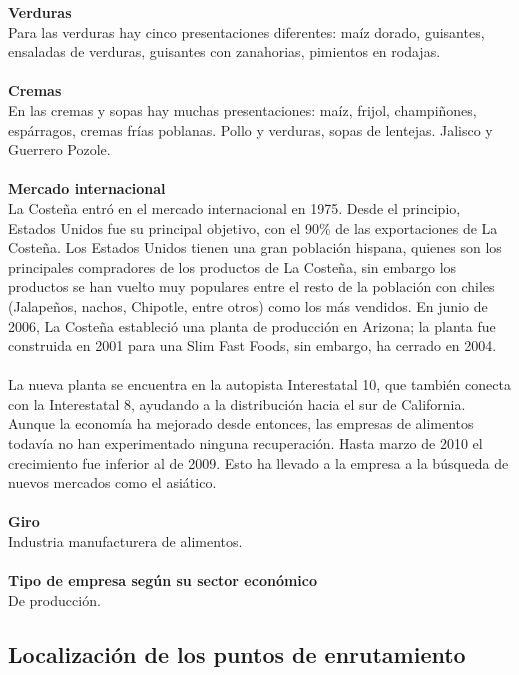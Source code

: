 \documentclass[12pt,letterpaper]{article}
\begin{document}
\textbf{Verduras} 
\\
Para las verduras hay cinco presentaciones diferentes: maíz dorado, guisantes, ensaladas de verduras, guisantes con zanahorias, pimientos en rodajas.
\\ \\
\textbf{Cremas} 
\\
En las cremas y sopas hay muchas presentaciones: maíz, frijol, champiñones, espárragos, cremas frías poblanas. Pollo y verduras, sopas de lentejas. Jalisco y Guerrero Pozole.
\\ \\
\textbf{Mercado internacional}
\\
La Costeña entró en el mercado internacional en 1975. Desde el principio, Estados Unidos fue su 
principal objetivo, con el 90\% de las exportaciones de La Costeña. Los Estados Unidos 
tienen una gran población hispana, quienes son los principales compradores de los productos 
de La Costeña, sin embargo los productos se han vuelto muy populares entre el resto de la 
población con chiles (Jalapeños, nachos, Chipotle, entre otros) como los más vendidos. En 
junio de 2006, La Costeña estableció una planta de producción en Arizona; la planta fue 
construida en 2001 para una Slim Fast Foods, sin embargo, ha cerrado en 2004. 
\\ \\
La nueva 
planta se encuentra en la autopista Interestatal 10, que también conecta con la 
Interestatal 8, ayudando a la distribución hacia el sur de California. Aunque la 
economía ha mejorado desde entonces, las empresas de alimentos todavía no han experimentado 
ninguna recuperación. Hasta marzo de 2010 el crecimiento fue inferior al de 2009. Esto ha 
llevado a la empresa a la búsqueda de nuevos mercados como el asiático.
\\ \\
\textbf{Giro} 
\\
Industria manufacturera de alimentos.
\\ \\
\textbf{Tipo de empresa según su sector económico} 
\\
De producción.

\subsection{Localización de los puntos de enrutamiento}
\end{document}
